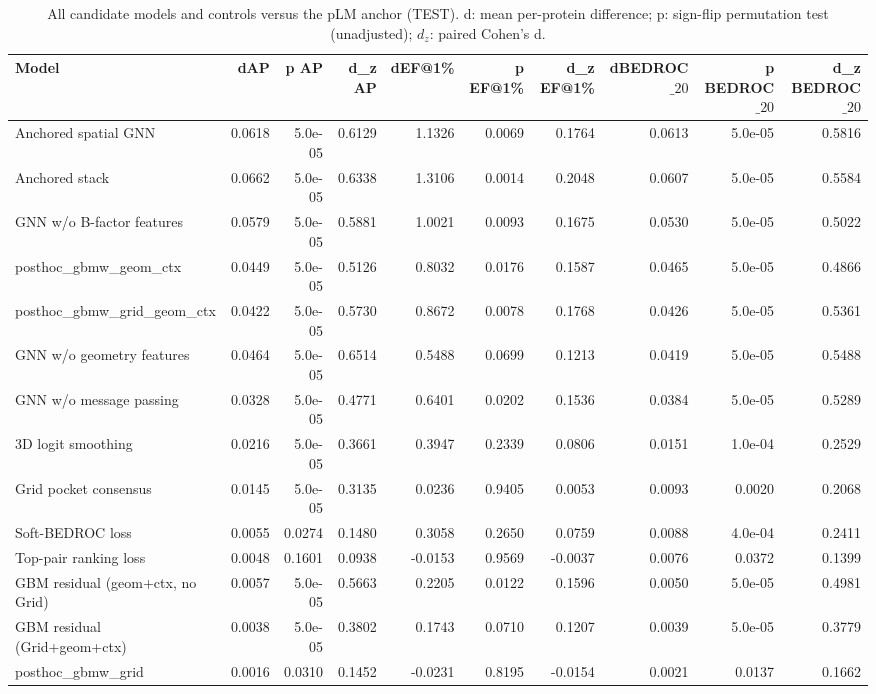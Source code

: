\begin{table}[t]
\centering
\small
\caption{All candidate models and controls versus the pLM anchor (TEST). d: mean per-protein difference; p: sign-flip permutation test (unadjusted); $d_z$: paired Cohen's d.}
\label{tab:table3_components_test}
\begin{tabular}{lrrrrrrrrr}
\toprule
Model & dAP & p AP & d\_z AP & dEF@1\% & p EF@1\% & d\_z EF@1\% & dBEDROC$\_{20}$ & p BEDROC$\_{20}$ & d\_z BEDROC$\_{20}$ \\
\midrule
Anchored spatial GNN & 0.0618 & 5.0e-05 & 0.6129 & 1.1326 & 0.0069 & 0.1764 & 0.0613 & 5.0e-05 & 0.5816 \\
Anchored stack & 0.0662 & 5.0e-05 & 0.6338 & 1.3106 & 0.0014 & 0.2048 & 0.0607 & 5.0e-05 & 0.5584 \\
GNN w/o B-factor features & 0.0579 & 5.0e-05 & 0.5881 & 1.0021 & 0.0093 & 0.1675 & 0.0530 & 5.0e-05 & 0.5022 \\
posthoc\_gbmw\_geom\_ctx & 0.0449 & 5.0e-05 & 0.5126 & 0.8032 & 0.0176 & 0.1587 & 0.0465 & 5.0e-05 & 0.4866 \\
posthoc\_gbmw\_grid\_geom\_ctx & 0.0422 & 5.0e-05 & 0.5730 & 0.8672 & 0.0078 & 0.1768 & 0.0426 & 5.0e-05 & 0.5361 \\
GNN w/o geometry features & 0.0464 & 5.0e-05 & 0.6514 & 0.5488 & 0.0699 & 0.1213 & 0.0419 & 5.0e-05 & 0.5488 \\
GNN w/o message passing & 0.0328 & 5.0e-05 & 0.4771 & 0.6401 & 0.0202 & 0.1536 & 0.0384 & 5.0e-05 & 0.5289 \\
3D logit smoothing & 0.0216 & 5.0e-05 & 0.3661 & 0.3947 & 0.2339 & 0.0806 & 0.0151 & 1.0e-04 & 0.2529 \\
Grid pocket consensus & 0.0145 & 5.0e-05 & 0.3135 & 0.0236 & 0.9405 & 0.0053 & 0.0093 & 0.0020 & 0.2068 \\
Soft-BEDROC loss & 0.0055 & 0.0274 & 0.1480 & 0.3058 & 0.2650 & 0.0759 & 0.0088 & 4.0e-04 & 0.2411 \\
Top-pair ranking loss & 0.0048 & 0.1601 & 0.0938 & -0.0153 & 0.9569 & -0.0037 & 0.0076 & 0.0372 & 0.1399 \\
GBM residual (geom+ctx, no Grid) & 0.0057 & 5.0e-05 & 0.5663 & 0.2205 & 0.0122 & 0.1596 & 0.0050 & 5.0e-05 & 0.4981 \\
GBM residual (Grid+geom+ctx) & 0.0038 & 5.0e-05 & 0.3802 & 0.1743 & 0.0710 & 0.1207 & 0.0039 & 5.0e-05 & 0.3779 \\
posthoc\_gbmw\_grid & 0.0016 & 0.0310 & 0.1452 & -0.0231 & 0.8195 & -0.0154 & 0.0021 & 0.0137 & 0.1662 \\

\end{tabular}
\end{table}
